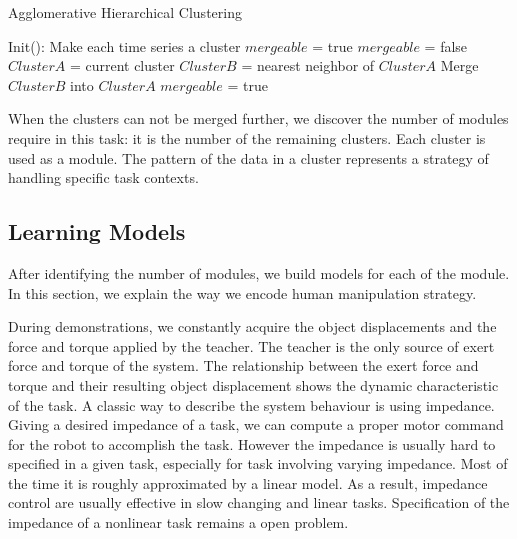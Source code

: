 \begin{algorithm}
  \caption{Agglomerative Hierarchical Clustering}
  \begin{algorithmic}[1]
    \State Init(): Make each time series a cluster\;
    \State $mergeable$ = true\;
      \State $mergeable$ = false\;
        \State $ClusterA$ = current cluster\;
        \State $ClusterB$ = nearest neighbor of $ClusterA$\;
            \State Merge $ClusterB$ into $ClusterA$\;
            \State $mergeable$ = true\;
        \EndIf
      \EndFor
    \EndWhile
    \EndFunction
  \end{algorithmic}
  \label{code:cluster}
\end{algorithm}



When the clusters can not be merged further, we discover the number of modules require in this task: it is the number of the remaining clusters. Each cluster is used as a module. The pattern of the data in a cluster represents a strategy of handling specific task contexts.

\subsection{Learning Models}
\label{sec:model}
After identifying the number of modules, we build models for each of the module. In this section, we explain the way we encode human manipulation strategy.

During demonstrations, we constantly acquire the object displacements and the force and torque applied by the teacher. The teacher is the only source of exert force and torque of the system. The relationship between the exert force and torque and their resulting object displacement shows the dynamic characteristic of the task. A classic way to describe the system behaviour is using impedance. Giving a desired impedance of a task, we can compute a proper motor command for the robot to accomplish the task. %
However the impedance is usually hard to specified in a given task, especially for task involving varying impedance. Most of the time it is roughly approximated by a linear model. As a result, impedance control are usually effective in slow changing and linear tasks. Specification of the impedance of a nonlinear task remains a open problem.

